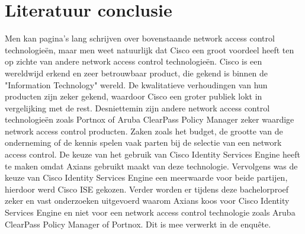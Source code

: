 \section{Literatuur conclusie}
Men kan pagina’s lang schrijven over bovenstaande network access control technologieën, maar men weet natuurlijk dat Cisco een groot voordeel heeft ten op zichte van andere network access control technologieën. Cisco is een wereldwijd erkend en zeer betrouwbaar product, die gekend is binnen de "Information Technology" wereld. De kwalitatieve verhoudingen van hun producten zijn zeker gekend, waardoor Cisco een groter publiek lokt in vergelijking met de rest.
\newline
\newline
Desniettemin zijn andere network access control technologieën zoals Portnox of Aruba ClearPass Policy Manager zeker waardige network access control producten. Zaken zoals het budget, de grootte van de onderneming of de kennis spelen vaak parten bij de selectie van een network access control. 
\newline
\newline
De keuze van het gebruik van Cisco Identity Services Engine heeft te maken omdat Axians gebruikt maakt van deze technologie. Vervolgens was de keuze van Cisco Identity Services Engine een meerwaarde voor beide partijen, hierdoor werd Cisco ISE gekozen. Verder worden er tijdens deze bachelorproef zeker en vast onderzoeken uitgevoerd waarom Axians koos voor Cisco Identity Services Engine en niet voor een network access control technologie zoals Aruba ClearPass Policy Manager of Portnox. Dit is mee verwerkt in de enquête.

